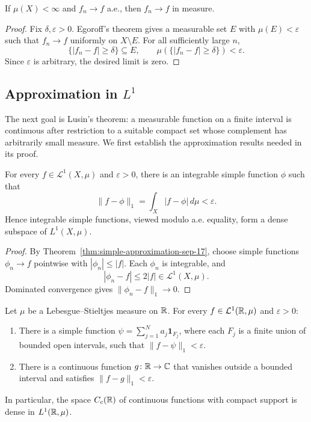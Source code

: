 \begin{corollary}\label{cor:ae-in-measure-oct-06}
  If $\mu(X)<\infty$ and $f_n\to f$ a.e., then $f_n\to f$ in
  measure.
\end{corollary}

\begin{proof}
  Fix $\delta,\varepsilon>0$. Egoroff's theorem gives a measurable
  set $E$ with $\mu(E)<\varepsilon$ such that $f_n\to f$ uniformly
  on $X\setminus E$. For all sufficiently large $n$,
  \[
    \{|f_n-f|\geq\delta\}\subseteq E,
    \qquad
    \mu(\{|f_n-f|\geq\delta\})<\varepsilon.
  \]
  Since $\varepsilon$ is arbitrary, the desired limit is zero.
\end{proof}

\subsection{Approximation in \texorpdfstring{$L^1$}{L1}}

The next goal is Lusin's theorem: a measurable function on a finite
interval is continuous after restriction to a suitable compact set
whose complement has arbitrarily small measure. We first establish
the approximation results needed in its proof.

\begin{lemma}
  \label{lem:simple-density-oct-06}
  For every $f\in\mathcal L^1(X,\mu)$ and $\varepsilon>0$, there
  is an integrable simple function $\phi$ such that
  \[
    \|f-\phi\|_1=\int_X|f-\phi|\,d\mu<\varepsilon.
  \]
  Hence integrable simple functions, viewed modulo a.e. equality,
  form a dense subspace of $L^1(X,\mu)$.
\end{lemma}

\begin{proof}
  By Theorem~\ref{thm:simple-approximation-sep-17}, choose simple
  functions $\phi_n\to f$ pointwise with $|\phi_n|\leq|f|$.
  Each $\phi_n$ is integrable, and
  \[
    |\phi_n-f|\leq2|f|\in\mathcal L^1(X,\mu).
  \]
  Dominated convergence gives $\|\phi_n-f\|_1\to0$.
\end{proof}

\begin{lemma}
  \label{lem:continuous-density-oct-06}
  Let $\mu$ be a Lebesgue--Stieltjes measure on $\mathbb{R}$. For every
  $f\in\mathcal L^1(\mathbb{R},\mu)$ and $\varepsilon>0$:
  \begin{enumerate}[label=(\roman*)]
    \item There is a simple function
      $\psi=\sum_{j=1}^N a_j\mathbf 1_{F_j}$, where each $F_j$ is
      a finite union of bounded open intervals, such that
      $\|f-\psi\|_1<\varepsilon$.
    \item There is a continuous function $g\colon\mathbb{R}\to\mathbb{C}$
      that vanishes outside a bounded interval and satisfies
      $\|f-g\|_1<\varepsilon$.
  \end{enumerate}
  In particular, the space $C_c(\mathbb{R})$ of continuous functions
  with compact support is dense in $L^1(\mathbb{R},\mu)$.
\end{lemma}

